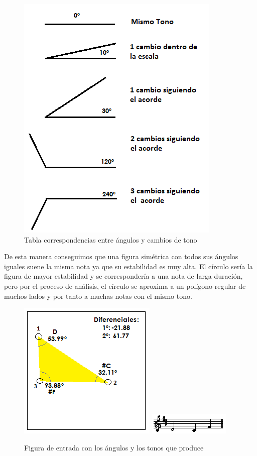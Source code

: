 		\begin{figure}[htbp]
		\centering
		\hspace*{0.0in}
		\includegraphics[scale=0.75]{graphics/tabla-corresp-Tono-Angulo.png}
		\caption{Tabla correspondencias entre ángulos y cambios de tono}
		\label{fig:Figura3Voz1}
		\end{figure}

De esta manera conseguimos que una figura simétrica con todos sus ángulos iguales suene la misma nota ya que su estabilidad es muy alta. El círculo sería la figura de mayor estabilidad y se correspondería a una nota de larga duración, pero por el proceso de análisis, el círculo se aproxima a un polígono regular de muchos lados y por tanto a muchas notas con el mismo tono.

		\begin{figure}[htbp]
		\centering
		\hspace*{0.0in}
		\includegraphics[scale=1.0]{graphics/simpletest1-F3.png}
		\includegraphics[scale=1.0]{graphics/simpletest1-MELpartitura.png}
		\caption{Figura de entrada con los ángulos y los tonos que produce}
		\label{fig:Figura4Voz1}
		\end{figure}

